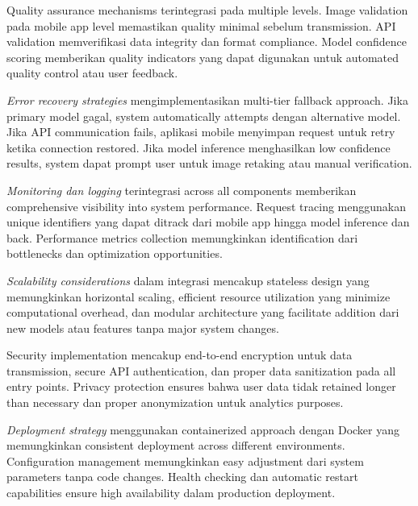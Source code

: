 Quality assurance mechanisms terintegrasi pada multiple levels. Image validation pada mobile app level memastikan quality minimal sebelum transmission. API validation memverifikasi data integrity dan format compliance. Model confidence scoring memberikan quality indicators yang dapat digunakan untuk automated quality control atau user feedback.

\emph{Error recovery strategies} mengimplementasikan multi-tier fallback approach. Jika primary model gagal, system automatically attempts dengan alternative model. Jika API communication fails, aplikasi mobile menyimpan request untuk retry ketika connection restored. Jika model inference menghasilkan low confidence results, system dapat prompt user untuk image retaking atau manual verification.

\emph{Monitoring dan logging} terintegrasi across all components memberikan comprehensive visibility into system performance. Request tracing menggunakan unique identifiers yang dapat ditrack dari mobile app hingga model inference dan back. Performance metrics collection memungkinkan identification dari bottlenecks dan optimization opportunities.


\emph{Scalability considerations} dalam integrasi mencakup stateless design yang memungkinkan horizontal scaling, efficient resource utilization yang minimize computational overhead, dan modular architecture yang facilitate addition dari new models atau features tanpa major system changes.

Security implementation mencakup end-to-end encryption untuk data transmission, secure API authentication, dan proper data sanitization pada all entry points. Privacy protection ensures bahwa user data tidak retained longer than necessary dan proper anonymization untuk analytics purposes.

\emph{Deployment strategy} menggunakan containerized approach dengan Docker yang memungkinkan consistent deployment across different environments. Configuration management memungkinkan easy adjustment dari system parameters tanpa code changes. Health checking dan automatic restart capabilities ensure high availability dalam production deployment.


